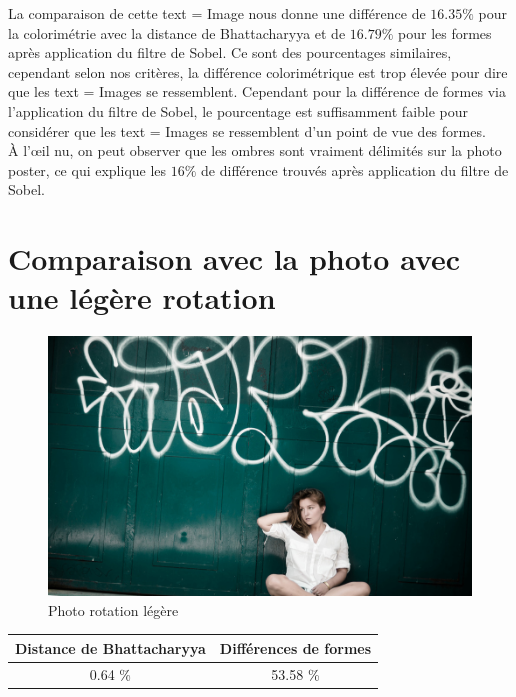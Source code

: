 \documentclass[]{article}
\begin{document}
La comparaison de cette text = Image nous donne une différence de $16.35 \%$
pour la colorimétrie avec la distance de Bhattacharyya et de $16.79 \%$
pour les formes après application du filtre de Sobel. Ce sont des
pourcentages similaires, cependant selon nos critères, la différence
colorimétrique est trop élevée pour dire que les text = Images se ressemblent.
Cependant pour la différence de formes via l'application du filtre de
Sobel, le pourcentage est suffisamment faible pour considérer que les
text = Images se ressemblent d'un point de vue des formes. \\
À l'\oe il nu, on peut observer que les ombres sont vraiment délimités sur la
photo poster, ce qui explique les $16 \%$ de différence trouvés après
application du filtre de Sobel.

\newpage

\section{Comparaison avec la photo avec une légère
rotation}\label{comparaison-avec-la-photo-avec-une-luxe9guxe8re-rotation}

\begin{figure}[htbp]
\centering
\includegraphics{photos/rotate.jpg}
\caption{Photo rotation légère}
\end{figure}

\begin{center}
\begin{tabular}{|c|c|}
  \hline
  Distance de Bhattacharyya & Différences de formes \\
  \hline
  0.64 \% & 53.58 \% \\
  \hline
\end{tabular}
\end{center}
\end{document}
